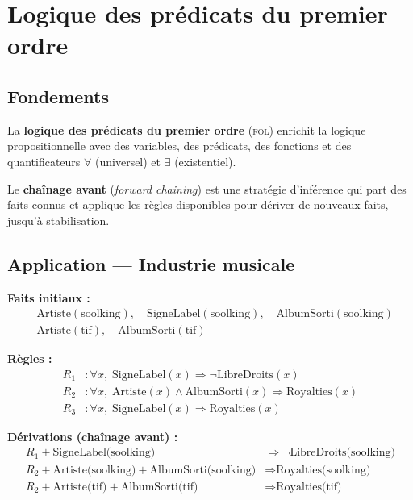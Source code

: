 \section{Logique des prédicats du premier ordre}

\subsection{Fondements}

La \textbf{logique des prédicats du premier ordre} (\textsc{fol}) enrichit la
logique propositionnelle avec des variables, des prédicats, des fonctions et des
quantificateurs $\forall$ (universel) et $\exists$ (existentiel).

\noindent Le \textbf{chaînage avant} (\emph{forward chaining}) est une stratégie
d'inférence qui part des faits connus et applique les règles disponibles pour
dériver de nouveaux faits, jusqu'à stabilisation.

\subsection{Application — Industrie musicale}

\textbf{Faits initiaux :}
\begin{align*}
&\text{Artiste}(\text{soolking}),\quad \text{SigneLabel}(\text{soolking}),\quad
 \text{AlbumSorti}(\text{soolking}) \\
&\text{Artiste}(\text{tif}),\quad \text{AlbumSorti}(\text{tif})
\end{align*}

\textbf{Règles :}
\begin{align*}
R_1&: \forall x,\; \text{SigneLabel}(x) \Rightarrow \lnot\text{LibreDroits}(x) \\
R_2&: \forall x,\; \text{Artiste}(x) \land \text{AlbumSorti}(x)
       \Rightarrow \text{Royalties}(x) \\
R_3&: \forall x,\; \text{SigneLabel}(x) \Rightarrow \text{Royalties}(x)
\end{align*}

\textbf{Dérivations (chaînage avant) :}
\begin{align*}
R_1 + \text{SigneLabel(soolking)} &\Rightarrow \lnot\text{LibreDroits(soolking)} \\
R_2 + \text{Artiste(soolking)} + \text{AlbumSorti(soolking)} &\Rightarrow \text{Royalties(soolking)} \\
R_2 + \text{Artiste(tif)} + \text{AlbumSorti(tif)} &\Rightarrow \text{Royalties(tif)}
\end{align*}


